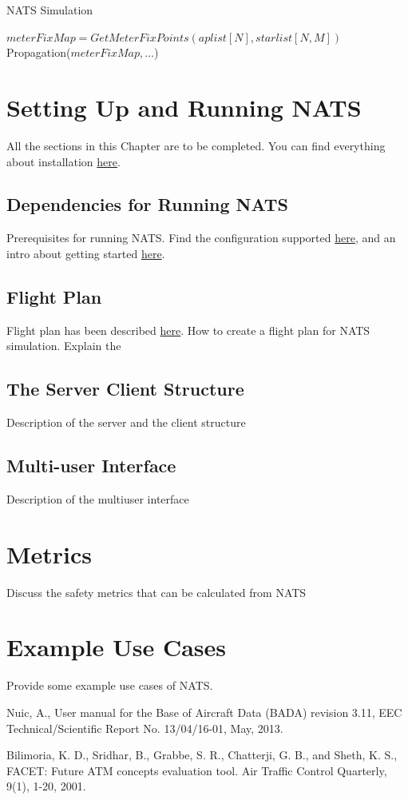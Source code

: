 \documentclass[11pt]{book}              %
\begin{document}
\begin{algorithm}[htbp]
\caption{NATS Simulation}\label{alg:MNSalgo4}
\begin{algorithmic}[1]
\State $meterFixMap = GetMeterFixPoints(aplist[N],starlist[N,M])$
\EndProcedure
\State Propagation($meterFixMap,\ldots$)
\end{algorithmic}
\end{algorithm}


\chapter{Setting Up and Running NATS}
{\color{red}All the sections in this Chapter are to be completed.}
You can find everything about installation \href{../doc/html/installation.html}{here}.
\section{Dependencies for Running NATS}
Prerequisites for running NATS.
Find the configuration supported \href{../doc/html/configuration.html}{here}, and an intro about getting started \href{..doc/html/getting_started.html}{here}.
\section{Flight Plan}
Flight plan has been described \href{../doc/html/ac_trx_flightPlan.html}{here}.
How to create a flight plan for NATS simulation. 
Explain the 
\section{The Server Client Structure}
Description of the server and the client structure
\section{Multi-user Interface}
Description of the multiuser interface
\chapter{Metrics}
Discuss the safety metrics that can be calculated from NATS

\chapter{Example Use Cases}
Provide some example use cases of NATS.

\begin{thebibliography}{9}
Nuic, A., User manual for the Base of Aircraft Data (BADA) revision 3.11, EEC Technical/Scientific Report No. 13/04/16-01, May, 2013.

Bilimoria, K. D., Sridhar, B., Grabbe, S. R., Chatterji, G. B., and Sheth, K. S., FACET: Future ATM concepts evaluation tool. Air Traffic Control Quarterly, 9(1), 1-20, 2001.

\end{thebibliography}
\end{document}
